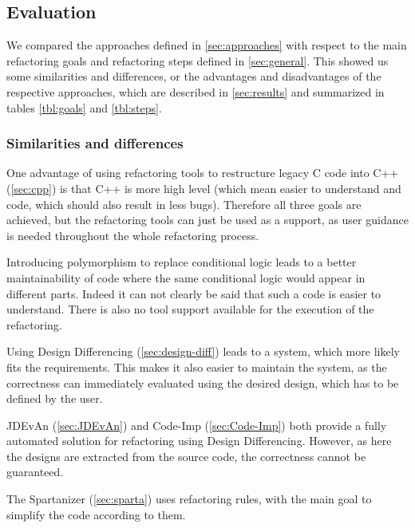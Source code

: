 \documentclass[conference,compsoc,a4paper]{IEEEtran}
\begin{document}
\subsection{Evaluation}

We compared the approaches defined in \autoref{sec:approaches} with respect to the main refactoring goals and refactoring steps defined in \autoref{sec:general}. This showed us some similarities and differences, or the advantages and disadvantages of the respective approaches, which are described in \autoref{sec:results} and summarized in tables \ref{tbl:goals} and \ref{tbl:steps}.

\subsubsection{Similarities and differences}\label{sec:results}

One advantage of using refactoring tools to restructure legacy C code into C++ (\autoref{sec:cpp}) is that C++ is more high level (which mean easier to understand and code, which should also result in less bugs). Therefore all three goals are achieved, but the refactoring tools can just be used as a support, as user guidance is needed throughout the whole refactoring process.

Introducing polymorphism to replace conditional logic leads to a better maintainability of code where the same conditional logic would appear in different parts. Indeed it can not clearly be said that such a code is easier to understand. There is also no tool support available for the execution of the refactoring.

Using Design Differencing (\autoref{sec:design-diff}) leads to a system, which more likely fits the requirements. This makes it also easier to maintain the system, as the correctness can immediately evaluated using the desired design, which has to be defined by the user.

JDEvAn (\autoref{sec:JDEvAn}) and Code-Imp (\autoref{sec:Code-Imp}) both provide a fully automated solution for refactoring using Design Differencing. However, as here the designs are extracted from the source code, the correctness cannot be guaranteed.

The Spartanizer (\autoref{sec:sparta}) uses refactoring rules, with the main goal to simplify the code according to them.
\end{document}
